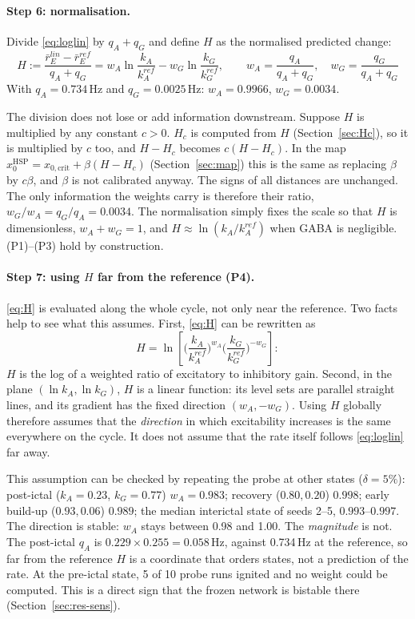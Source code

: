 \documentclass[11pt]{article}
\newcommand{\kA}{k_A}
\newcommand{\kG}{k_G}
\newcommand{\xc}{x_{0,\mathrm{crit}}}
\newcommand{\xh}{x_0^{\mathrm{HSP}}}
\begin{document}
\paragraph{Step 6: normalisation.}
Divide \eqref{eq:loglin} by $q_A+q_G$ and define $H$ as the normalised predicted change:
\begin{equation}\boxed{\;H := \frac{\bar r_E^{lin}-\bar r_E^{ref}}{q_A+q_G}
= w_A\ln\frac{\kA}{\kA^{ref}} - w_G\ln\frac{\kG}{\kG^{ref}},\qquad
w_{A} = \frac{q_A}{q_A+q_G},\quad w_G = \frac{q_G}{q_A+q_G}\;}\label{eq:H}\end{equation}
With $q_A=0.734$\,Hz and $q_G=0.0025$\,Hz: $w_A = 0.9966$, $w_G = 0.0034$.

The division does not lose or add information downstream. Suppose $H$ is multiplied by any constant $c>0$. $H_c$ is
computed from $H$ (Section~\ref{sec:Hc}), so it is multiplied by $c$ too, and $H-H_c$ becomes $c(H-H_c)$. In the map
$\xh = \xc + \beta(H-H_c)$ (Section~\ref{sec:map}) this is the same as replacing $\beta$ by $c\beta$, and $\beta$ is not
calibrated anyway. The signs of all distances are unchanged. The only information the weights carry is therefore their
ratio, $w_G/w_A = q_G/q_A = 0.0034$. The normalisation simply fixes the scale so that $H$ is dimensionless,
$w_A+w_G=1$, and $H\approx\ln(\kA/\kA^{ref})$ when GABA is negligible. (P1)--(P3) hold by construction.

\paragraph{Step 7: using $H$ far from the reference (P4).}
\eqref{eq:H} is evaluated along the whole cycle, not only near the reference. Two facts help to see what this assumes.
First, \eqref{eq:H} can be rewritten as
\[
H = \ln\!\left[\Big(\frac{\kA}{\kA^{ref}}\Big)^{w_A}\Big(\frac{\kG}{\kG^{ref}}\Big)^{-w_G}\right]:
\]
$H$ is the log of a weighted ratio of excitatory to inhibitory gain. Second, in the plane $(\ln\kA,\ln\kG)$, $H$ is a
linear function: its level sets are parallel straight lines, and its gradient has the fixed direction $(w_A,-w_G)$.
Using $H$ globally therefore assumes that the \emph{direction} in which excitability increases is the same everywhere
on the cycle. It does not assume that the rate itself follows \eqref{eq:loglin} far away.

This assumption can be checked by repeating the probe at other states ($\delta=5\%$): post-ictal ($\kA=0.23$,
$\kG=0.77$) $w_A=0.983$; recovery ($0.80, 0.20$) $0.998$; early build-up ($0.93, 0.06$) $0.989$; the median interictal
state of seeds 2--5, $0.993$--$0.997$. The direction is stable: $w_A$ stays between 0.98 and 1.00. The
\emph{magnitude} is not. The post-ictal $q_A$ is $0.229\times0.255=0.058$\,Hz, against 0.734\,Hz at the reference, so
far from the reference $H$ is a coordinate that orders states, not a prediction of the rate. At the pre-ictal state,
5 of 10 probe runs ignited and no weight could be computed. This is a direct sign that the frozen network is bistable
there (Section~\ref{sec:res-sens}).
\end{document}
